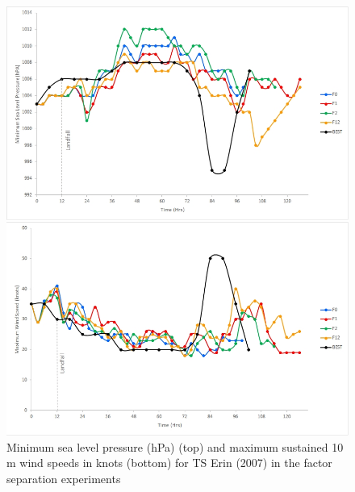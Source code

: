 \documentclass[fleqn,10pt]{wlscirep}
\begin{document}
\begin{figure}[ht]
\centering
\includegraphics[width=\linewidth]{ERIN_Facsep}
\caption{Minimum sea level pressure (hPa) (top) and maximum sustained 10 m wind speeds in knots (bottom) for TS Erin (2007) in the factor separation experiments}
\label{fig:facsep_erin}
\end{figure}
\end{document}
